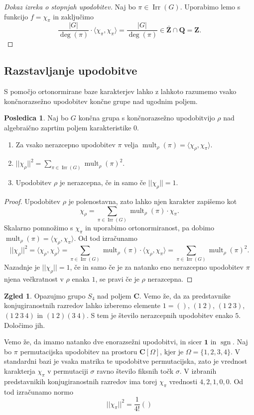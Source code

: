 \documentclass[11pt]{book}
\def\ZZ{\mathbf{Z}}
\def\QQ{\mathbf{Q}}
\def\CC{\mathbf{C}}
\def\11{\mathbf{1}}
\DeclareMathOperator\sgn{sgn}
\DeclareMathOperator\mult{mult}
\DeclareMathOperator\Irr{Irr}
\theoremstyle{definition}
\theoremstyle{zgled}
\newtheorem*{zgled}{Zgled}
\theoremstyle{odprtproblem}
\theoremstyle{domacanaloga}
\newenvironment{dokaz}
    {\color{siva}\begin{proof}}
    {\end{proof}}
\theoremstyle{izrek}
\newtheorem*{posledica}{Posledica}
\begin{document}
    \begin{dokaz}[Dokaz izreka o stopnjah upodobitev]
    Naj bo $\pi \in \Irr(G)$. Uporabimo lemo s funkcijo $f = \chi_{\pi}$ in zaključimo
    \[
        \frac{|G|}{\deg(\pi)} \cdot \langle \chi_{\pi}, \chi_{\pi} \rangle = \frac{|G|}{\deg(\pi)} \in \bar{\ZZ} \cap \QQ = \ZZ.
    \]
    \end{dokaz}

\subsection{Razstavljanje upodobitve}

S pomočjo ortonormirane baze karakterjev lahko z lahkoto razumemo vsako končnorazsežno upodobitev končne grupe nad ugodnim poljem.

\begin{posledica}
Naj bo $G$ končna grupa s končnorazsežno upodobitvijo $\rho$ nad algebraično zaprtim poljem karakteristike $0$. 
\begin{enumerate}
    \item Za vsako nerazcepno upodobitev $\pi$ velja $\mult_{\rho}(\pi) = \langle \chi_{\rho}, \chi_{\pi} \rangle$.
    \item $|| \chi_{\rho} ||^2 = \sum_{\pi \in \Irr(G)} \mult_{\rho}(\pi)^2$.
    \item Upodobitev $\rho$ je nerazcepna, če in samo če $|| \chi_{\rho} || = 1$.
\end{enumerate}
\end{posledica}
\begin{dokaz}
Upodobitev $\rho$ je polenostavna, zato lahko njen karakter zapišemo kot
\[
    \chi_{\rho} = \sum_{\pi \in \Irr(G)} \mult_{\rho}(\pi) \cdot \chi_{\pi}.
\]
Skalarno pomnožimo s $\chi_{\pi}$ in uporabimo ortonormiranost, pa dobimo $\mult_{\rho}(\pi) = \langle \chi_{\rho}, \chi_{\pi} \rangle$. Od tod izračunamo
\[
    ||\chi_{\rho}||^2 = \langle \chi_{\rho}, \chi_{\rho} \rangle 
    = \sum_{\pi \in \Irr(G)} \mult_{\rho}(\pi) \cdot \langle \chi_{\rho}, \chi_{\pi} \rangle 
    = \sum_{\pi \in \Irr(G)} \mult_{\rho}(\pi)^2.
\]
Nazadnje je $||\chi_{\rho}|| = 1$, če in samo če je za natanko eno nerazcepno upodobitev $\pi$ njena večkratnost v $\rho$ enaka $1$, se pravi če je $\rho$ nerazcepna.
\end{dokaz}

\begin{zgled}
Opazujmo grupo $S_4$ nad poljem $\CC$. Vemo že, da za predstavnike konjugiranostnih razredov lahko izberemo elemente $1 = ()$, $(1 \ 2)$, $(1 \ 2 \ 3)$, $(1 \ 2 \ 3 \ 4)$ in $(1 \ 2)(3 \ 4)$. S tem je število nerazcepnih upodobitev enako $5$. Določimo jih. 

Vemo že, da imamo natanko dve enorazsežni upodobitvi, in sicer $\11$ in $\sgn$. Naj bo $\pi$ permutacijska upodobitev na prostoru $\CC[\Omega]$, kjer je $\Omega = \{ 1,2,3,4 \}$. V standardni bazi je vsaka matrika te upodobitve permutacijska, zato je vrednost karakterja $\chi_{\pi}$ v permutaciji $\sigma$ ravno število fiksnih točk $\sigma$. V izbranih predstavnikih konjugiranostnih razredov ima torej $\chi_{\pi}$ vrednosti $4, 2, 1, 0, 0$. Od tod izračunamo normo
\[
    ||\chi_{\pi}||^2 = \frac{1}{4!} \left(  \right)
\]
\todo{}
\end{zgled}
\end{document}
